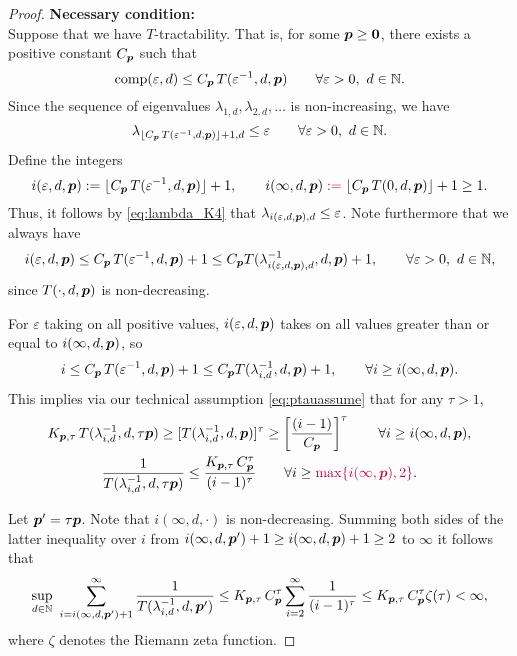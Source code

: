 \documentclass[11pt,a4paper]{article}
\newcommand{\peter}[1]{\begingroup\color{purple}#1\endgroup}
\begin{document}
\begin{proof}
\noindent \textbf{Necessary condition:}\\
Suppose that we have
$T$-tractability. That is, for some $\boldsymbol{p} \ge \boldsymbol{0}$, there exists a positive constant $C_{\boldsymbol{p}}$ such that
\[
\operatorname{comp}(\varepsilon,d)\le C_{\boldsymbol{p}}\, T(\varepsilon^{-1},d,\boldsymbol{p}) \qquad \forall \varepsilon > 0,  \ d \in \mathbb{N}.
\]
Since the sequence of eigenvalues $\lambda_{1,d}, \lambda_{2,d}, \ldots $ is non-increasing, we have
\begin{equation}\label{eq:lambda_K4}
	\lambda_{\lfloor C_{\boldsymbol{p}}\, T(\varepsilon^{-1},d,\boldsymbol{p})\rfloor +1,d}\le \varepsilon \qquad \forall \varepsilon > 0,  \ d \in \mathbb{N}.
\end{equation}
Define the integers
\[
i (\varepsilon,d,\vp):= \lfloor C_{\vp}\, T(\varepsilon^{-1},d,\vp)\rfloor +1, \qquad
i (\infty,d,\vp) \peter{:=} \lfloor C_{\vp}\, T(0,d,\vp)\rfloor +1 \ge 1.
\]
Thus, it follows by \eqref{eq:lambda_K4} that $\lambda_{i(\varepsilon,d,\boldsymbol{p}),d} \le \varepsilon$.
Note furthermore that we always have
\[
i(\varepsilon,d,\boldsymbol{p})\le C_{\boldsymbol{p}}\, T(\varepsilon^{-1},d,\boldsymbol{p})+1 \le C_{\boldsymbol{p}} T(\lambda_{i(\varepsilon,d,\boldsymbol{p}),d}^{-1},d,\boldsymbol{p})+1, \qquad \forall \varepsilon > 0, \ d \in \mathbb{N},
\]
since
$T(\cdot,d,\boldsymbol{p})$ is non-decreasing.

For $\varepsilon$ taking on all positive values, $i(\varepsilon,d,\boldsymbol{p})$ takes on all values greater than or equal to $i(\infty,d,\boldsymbol{p})$, so
\[
i\le C_{\boldsymbol{p}}\, T(\varepsilon^{-1},d,\boldsymbol{p})+1 \le C_{\boldsymbol{p}} T(\lambda_{i,d}^{-1},d,\boldsymbol{p})+1, \qquad \forall i \ge i(\infty,d,\boldsymbol{p}).
\]
This implies via our technical assumption \eqref{eq:ptauassume} that for any $\tau > 1$,
\begin{gather*}
	K_{\vp,\tau}\,T (\lambda_{i,d}^{-1},d,\tau \vp) \ge
	[T(\lambda_{i,d}^{-1},d, \vp)]^\tau
	\ge
	\left[\frac{(i-1)}{C_{\vp}}\right]^\tau \qquad \forall i \ge i(\infty,d,\vp), \\
	 \frac{1}{T (\lambda_{i,d}^{-1},d,\tau \vp)} \le
	\frac{K_{\vp,\tau}\, C_{\vp}^\tau}{(i-1)^\tau}\qquad \forall i \ge \peter{\max\{i(\infty,\vp),2\}}.
\end{gather*}

Let $\boldsymbol{p}' = \tau \boldsymbol{p}$.  Note that $i(\infty,d,\cdot)$ is non-decreasing.  Summing both sides of the \peter{latter} inequality over $i$ from $i(\infty,d,\boldsymbol{p}') + 1 \ge i(\infty,d, \boldsymbol{p}) + 1 \ge 2$ to $\infty$ it follows that
\begin{equation*}
	\sup_{d\in\mathbb{N}} \, \, \sum_{i=i (\infty,d,\boldsymbol{p}')+1}^\infty \frac{1}{T (\lambda_{i,d}^{-1},d,\boldsymbol{p}')}
	 \le  K_{\boldsymbol{p},\tau}\, C_{\boldsymbol{p}}^\tau
	\sum_{i=2}^\infty \frac{1}{(i-1)^\tau} \\
	 \le  K_{\boldsymbol{p},\tau}\, C_{\boldsymbol{p}}^\tau
	\zeta (\tau)  < \infty,
\end{equation*}
where $\zeta$ denotes the Riemann zeta function.



\end{proof}
\end{document}
